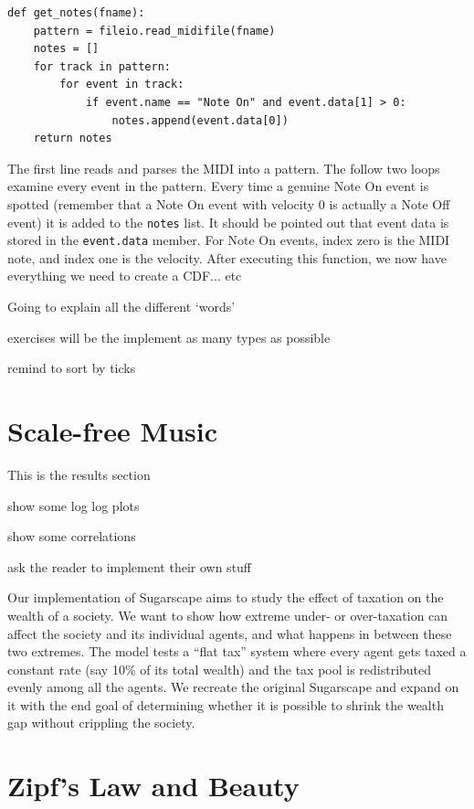 \documentclass[10pt]{book}
\begin{document}
\begin{verbatim}
def get_notes(fname):
    pattern = fileio.read_midifile(fname)
    notes = []
    for track in pattern:
        for event in track:
            if event.name == "Note On" and event.data[1] > 0:
                notes.append(event.data[0])
    return notes
\end{verbatim}

The first line reads and parses the MIDI into a pattern. The follow two loops examine every event in the pattern. Every time a genuine Note On event is spotted (remember that a Note On event with velocity 0 is actually a Note Off event) it is added to the \texttt{notes} list. It should be pointed out that event data is stored in the \texttt{event.data} member. For Note On events, index zero is the MIDI note, and index one is the velocity. After executing this function, we now have everything we need to create a CDF... etc



Going to explain all the different `words'

exercises will be the implement as many types as possible

remind to sort by ticks


\section{Scale-free Music}

This is the results section

show some log log plots

show some correlations

ask the reader to implement their own stuff

Our implementation of Sugarscape aims to study the effect of taxation
on the wealth of a society. We want to show how extreme under- or
over-taxation can affect the society and its individual agents, and
what happens in between these two extremes. The model tests a ``flat
tax'' system where every agent gets taxed a constant rate (say 10\% of
its total wealth) and the tax pool is redistributed evenly among all
the agents. We recreate the original Sugarscape and expand on it with
the end goal of determining whether it is possible to shrink the wealth gap
without crippling the society.




\section{Zipf's Law and Beauty}
\end{document}
